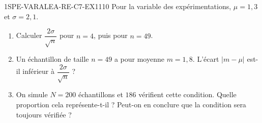 
\begin{exercice}{1SPE-VARALEA-RE-C7-EX1}{1}{10}
Pour la variable des expérimentations, $\mu=1{,}3$ et $\sigma=2{,}1$.
\begin{enumerate}
  \item Calculer $\dfrac{2\sigma}{\sqrt{n}}$ pour $n=4$, puis pour $n=49$.
  \item Un échantillon de taille $n=49$ a pour moyenne $m=1{,}8$.
        L'écart $\lvert m-\mu\rvert$ est-il inférieur à $\dfrac{2\sigma}{\sqrt{n}}$ ?
  \item On simule $N=200$ échantillons et $186$ vérifient cette condition.
        Quelle proportion cela représente-t-il ? Peut-on en conclure que la
        condition sera toujours vérifiée ?
\end{enumerate}
\end{exercice}

